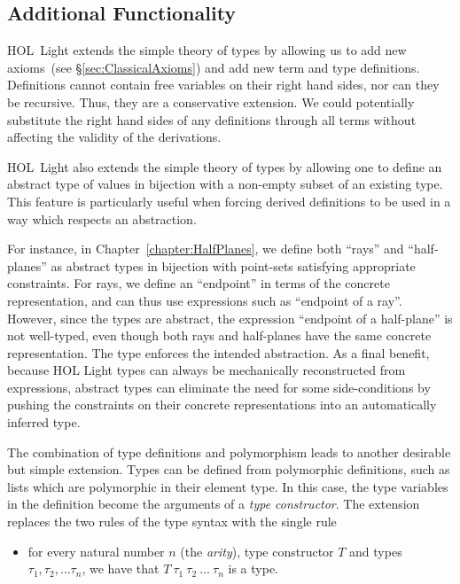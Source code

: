 \subsection{Additional Functionality}
HOL~Light extends the simple theory of types by allowing us to add new axioms~(see \S\ref{sec:ClassicalAxioms}) and add new term and type definitions. Definitions cannot contain free variables on their right hand sides, nor can they be recursive. Thus, they are a conservative extension. We could potentially substitute the right hand sides of any definitions through all terms without affecting the validity of the derivations.

HOL~Light also extends the simple theory of types by allowing one to define an abstract type of values in bijection with a non-empty subset of an existing type. This feature is particularly useful when forcing derived definitions to be used in a way which respects an abstraction.

For instance, in Chapter~\ref{chapter:HalfPlanes}, we define both ``rays'' and ``half-planes'' as abstract types in bijection with point-sets satisfying appropriate constraints. For rays, we define an ``endpoint'' in terms of the concrete representation, and can thus use expressions such as ``endpoint of a ray''. However, since the types are abstract, the expression ``endpoint of a half-plane'' is not well-typed, even though both rays and half-planes have the same concrete representation. The type  enforces the intended abstraction. As a final benefit, because HOL Light types can always be mechanically reconstructed from expressions, abstract types can eliminate the need for some side-conditions by pushing the constraints on their concrete representations into an automatically inferred type.

The combination of type definitions and polymorphism leads to another desirable but simple extension. Types can be defined from polymorphic definitions, such as lists which are polymorphic in their element type. In this case, the type variables in the definition become the arguments of a \emph{type constructor}. The extension replaces the two rules of the type syntax with the single rule

\begin{itemize}
\item[] for every natural number $n$ (the \emph{arity}), type constructor $T$ and types $\tau_1, \tau_2, \ldots \tau_n$, we have that $T\ \tau_1\ \tau_2\ \ldots\ \tau_n$ is a type.
\end{itemize}

